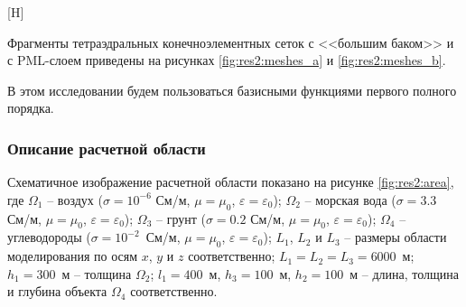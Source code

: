 \documentclass[a4paper,14pt]{article}
\makeatletter
\renewenvironment{figure}[1][\fps@figure]{
  \edef\@tempa{\noexpand\@float{figure}[#1]}
  \@tempa
  \addtocounter{foofigure}{1}
}{
  \end@float
}
\makeatother
\begin{document}
\begin{figure}[H]
	\centering
	\caption{конечноэлементные сетки: (а) <<большой бак>> и (б) PML-слой}
	\label{fig:res2:meshes}
\end{figure}

Фрагменты тетраэдральных конечноэлементных сеток с <<большим баком>> и с PML-слоем приведены на рисунках \ref{fig:res2:meshes_a} и \ref{fig:res2:meshes_b}.

В этом исследовании будем пользоваться базисными функциями первого полного порядка.

\subsubsection{Описание расчетной области}
Схематичное изображение расчетной области показано на рисунке \ref{fig:res2:area}, где $\Omega_1$ -- воздух ($\sigma=10^{-6}$ См/м, $\mu=\mu_0$, $\varepsilon=\varepsilon_0$); $\Omega_2$ -- морская вода ($\sigma=3.3$ См/м, $\mu=\mu_0$, $\varepsilon=\varepsilon_0$); $\Omega_3$ -- грунт ($\sigma=0.2$ См/м, $\mu=\mu_0$, $\varepsilon=\varepsilon_0$); $\Omega_4$ -- углеводороды ($\sigma=10^{-2}$~См/м, $\mu=\mu_0$, $\varepsilon=\varepsilon_0$); $L_1$, $L_2$ и $L_3$ -- размеры области моделирования по осям $x$, $y$ и $z$ соответственно; $L_1 = L_2 = L_3 = 6000$~м; $h_1=300$~м -- толщина $\Omega_2$; $l_1=400$~м, $h_3=100$~м, $h_2=100$~м -- длина, толщина и глубина объекта $\Omega_4$ соответственно.
\end{document}
